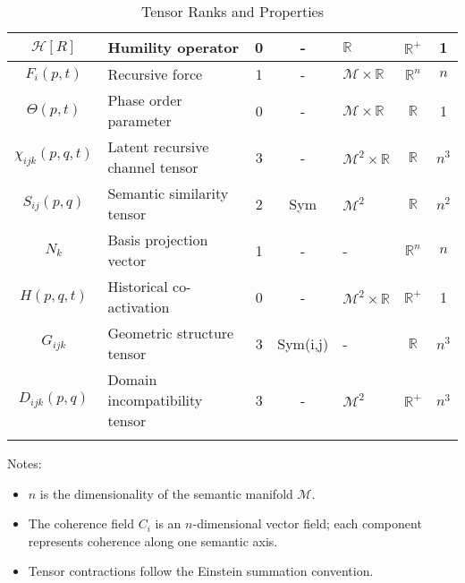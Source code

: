 {\begin{longtable}{|c|p{5.5cm}|c|c|p{1.5cm}|c|c|}
\hline
\(\mathcal{H}[R]\) & Humility operator & 0 & - & \(\mathbb{R}\) & \(\mathbb{R}^+\) & 1 \\
\hline
\(F_i(p,t)\) & Recursive force & 1 & - & \(\mathcal{M} \times \mathbb{R}\) & \(\mathbb{R}^n\) & \(n\) \\
\hline
\(\Theta(p,t)\) & Phase order parameter & 0 & - & \(\mathcal{M} \times \mathbb{R}\) & \(\mathbb{R}\) & 1 \\
\hline
\(\chi_{ijk}(p,q,t)\) & Latent recursive channel tensor & 3 & - & \(\mathcal{M}^2 \times \mathbb{R}\) & \(\mathbb{R}\) & \(n^3\) \\
\hline
\(S_{ij}(p,q)\) & Semantic similarity tensor\footnotemark[2] & 2 & Sym & \(\mathcal{M}^2\) & \(\mathbb{R}\) & \(n^2\) \\
\hline
\(N_k\) & Basis projection vector & 1 & - & - & \(\mathbb{R}^n\) & \(n\) \\
\hline
\(H(p,q,t)\) & Historical co-activation\footnotemark[3] & 0 & - & \(\mathcal{M}^2 \times \mathbb{R}\) & \(\mathbb{R}^+\) & 1 \\
\hline
\(G_{ijk}\) & Geometric structure tensor & 3 & Sym(i,j) & - & \(\mathbb{R}\) & \(n^3\) \\
\hline
\(D_{ijk}(p,q)\) & Domain incompatibility tensor & 3 & - & \(\mathcal{M}^2\) & \(\mathbb{R}^+\) & \(n^3\) \\
\hline
\caption{Tensor Ranks and Properties}
\end{longtable}
}

Notes:
\begin{itemize}
    \item \(n\) is the dimensionality of the semantic manifold \(\mathcal{M}\).
    \item The coherence field \(C_i\) is an \(n\)-dimensional vector field; each component represents coherence along one semantic axis.
    \item Tensor contractions follow the Einstein summation convention.
\end{itemize}

